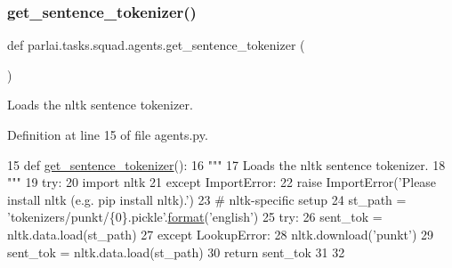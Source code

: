 \subsubsection{\texorpdfstring{get\+\_\+sentence\+\_\+tokenizer()}{get\_sentence\_tokenizer()}}
{\footnotesize\ttfamily def parlai.\+tasks.\+squad.\+agents.\+get\+\_\+sentence\+\_\+tokenizer (\begin{DoxyParamCaption}{ }\end{DoxyParamCaption})}

\begin{DoxyVerb}Loads the nltk sentence tokenizer.
\end{DoxyVerb}
 

Definition at line 15 of file agents.\+py.


\begin{DoxyCode}
15 \textcolor{keyword}{def }\hyperlink{namespaceparlai_1_1tasks_1_1squad_1_1agents_aedb3f218a9f6d84f322f3b17372bd047}{get\_sentence\_tokenizer}():
16     \textcolor{stringliteral}{"""}
17 \textcolor{stringliteral}{    Loads the nltk sentence tokenizer.}
18 \textcolor{stringliteral}{    """}
19     \textcolor{keywordflow}{try}:
20         \textcolor{keyword}{import} nltk
21     \textcolor{keywordflow}{except} ImportError:
22         \textcolor{keywordflow}{raise} ImportError(\textcolor{stringliteral}{'Please install nltk (e.g. pip install nltk).'})
23     \textcolor{comment}{# nltk-specific setup}
24     st\_path = \textcolor{stringliteral}{'tokenizers/punkt/\{0\}.pickle'}.\hyperlink{namespaceparlai_1_1chat__service_1_1services_1_1messenger_1_1shared__utils_a32e2e2022b824fbaf80c747160b52a76}{format}(\textcolor{stringliteral}{'english'})
25     \textcolor{keywordflow}{try}:
26         sent\_tok = nltk.data.load(st\_path)
27     \textcolor{keywordflow}{except} LookupError:
28         nltk.download(\textcolor{stringliteral}{'punkt'})
29         sent\_tok = nltk.data.load(st\_path)
30     \textcolor{keywordflow}{return} sent\_tok
31 
32 
\end{DoxyCode}
